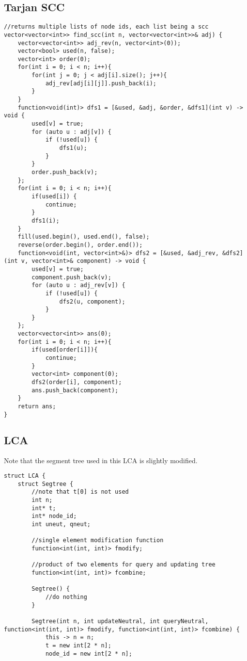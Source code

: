 \documentclass[8pt, headheight=10pt]{scrartcl}
\begin{document}
\begin{multicols*}{3}
\subsection{Tarjan SCC}
\begin{lstlisting}
//returns multiple lists of node ids, each list being a scc
vector<vector<int>> find_scc(int n, vector<vector<int>>& adj) {
    vector<vector<int>> adj_rev(n, vector<int>(0));
    vector<bool> used(n, false);
    vector<int> order(0);
    for(int i = 0; i < n; i++){
        for(int j = 0; j < adj[i].size(); j++){
            adj_rev[adj[i][j]].push_back(i);
        }
    }
    function<void(int)> dfs1 = [&used, &adj, &order, &dfs1](int v) -> void {
        used[v] = true;
        for (auto u : adj[v]) {
            if (!used[u]) {
                dfs1(u);
            }
        }
        order.push_back(v);
    };
    for(int i = 0; i < n; i++){
        if(used[i]) {
            continue;
        }
        dfs1(i);
    }
    fill(used.begin(), used.end(), false);
    reverse(order.begin(), order.end());
    function<void(int, vector<int>&)> dfs2 = [&used, &adj_rev, &dfs2](int v, vector<int>& component) -> void {
        used[v] = true;
        component.push_back(v);
        for (auto u : adj_rev[v]) {
            if (!used[u]) {
                dfs2(u, component);
            }
        }
    };
    vector<vector<int>> ans(0);
    for(int i = 0; i < n; i++){
        if(used[order[i]]){
            continue;
        }
        vector<int> component(0);
        dfs2(order[i], component);
        ans.push_back(component);
    }
    return ans;
}
\end{lstlisting}

\subsection{LCA}
Note that the segment tree used in this LCA is slightly modified. 
\begin{lstlisting}
struct LCA {
    struct Segtree {
        //note that t[0] is not used
        int n;
        int* t;
        int* node_id;
        int uneut, qneut;

        //single element modification function
        function<int(int, int)> fmodify;

        //product of two elements for query and updating tree
        function<int(int, int)> fcombine;

        Segtree() {
            //do nothing
        }

        Segtree(int n, int updateNeutral, int queryNeutral, function<int(int, int)> fmodify, function<int(int, int)> fcombine) {
            this -> n = n;
            t = new int[2 * n];
            node_id = new int[2 * n];


\end{lstlisting}
\end{multicols*}
\end{document}
